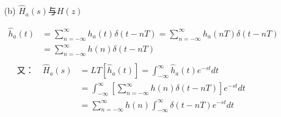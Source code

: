 \documentclass[notheorems,compress,mathserif,table]{beamer}
\begin{document}
%
%
\begin{frame}[shrink]\frametitle{}%
\begin{enumerate}
    \item[(b)] $\hat{H}_a(s)$与$H(z)$
\end{enumerate}
            \begin{equation*}
              \begin{split}
                \hat{h}_a(t) &=\sum_{n=-\infty}^{\infty}h_a(t)\delta(t-nT)
                             =\sum_{n=-\infty}^{\infty}h_a(nT)\delta(t-nT)\\
                             &=\sum_{n=-\infty}^{\infty}h(n)\delta(t-nT)\\
              \end{split}
            \end{equation*}
            \begin{equation*}
              \begin{split}
            \mbox{又：}\quad     \hat{H}_a(s)
                     &= LT[\hat{h}_a(t)]
                      =\int_{-\infty}^{\infty}\hat{h}_a(t)e^{-st}dt\quad\quad\quad\quad\quad\quad\\
                     &=\int_{-\infty}^{\infty}\left[
                            \sum_{n=-\infty}^{\infty}h(n)\delta(t-nT)\right]e^{-st}dt\\
                     &=\sum_{n=-\infty}^{\infty}h(n)\int_{-\infty}^{\infty}
                             \delta(t-nT)e^{-st}dt\\
              \end{split}
            \end{equation*}
\end{frame}
%
%
\end{document}
